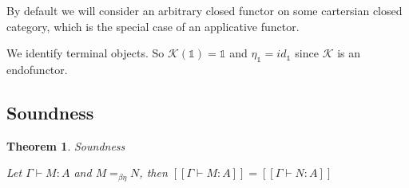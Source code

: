 \documentclass[a4paper]{article}
\newtheorem{theorem}{Theorem}
\begin{document}
By default we will consider an arbitrary closed functor on some cartersian closed category, which is the special case of an applicative functor.

We identify terminal objects. So $\mathcal{K}(\mathds{1}) = \mathds{1}$ and $\eta_{\mathds{1}} = id_{\mathds{1}}$ since $\mathcal{K}$ is an endofunctor.

\subsection{Soundness}

\begin{theorem} Soundness

  Let $\Gamma \vdash M : A$ and $M =_{\beta\eta} N$, then $[\![\Gamma \vdash M : A]\!] = [\![\Gamma \vdash N : A]\!]$
\end{theorem}
\end{document}
